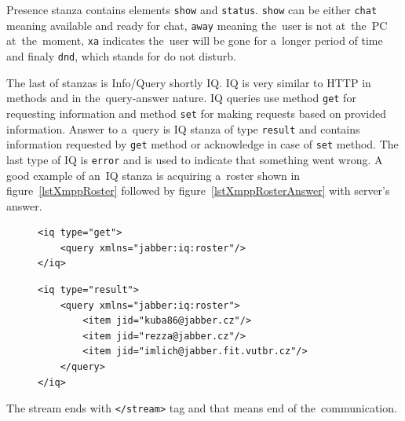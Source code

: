 Presence stanza contains elements \verb|show| and \verb|status|. \verb|show| can be either \verb|chat| meaning available and ready for chat, \verb|away| meaning the~user is not at~the~PC at~the~moment, \verb|xa| indicates the~user will be gone for a~longer period of time and finaly \verb|dnd|, which stands for do not disturb.  

The last of stanzas is Info/Query shortly IQ. IQ is very similar to HTTP in methods and in the~query-answer nature. IQ queries use method \verb|get| for requesting information and method \verb|set| for making requests based on provided information. Answer to a~query is IQ stanza of type \verb|result| and contains information requested by \verb|get| method or acknowledge in case of \verb|set| method. The last type of IQ is \verb|error| and is used to indicate that something went wrong. A good example of an~IQ stanza is acquiring a~roster shown in figure~\ref{lstXmppRoster} followed by figure~\ref{lstXmppRosterAnswer} with server's answer.

\begin{figure}[h]
\begin{lstlisting}
<iq type="get">
	<query xmlns="jabber:iq:roster"/>
</iq>
\end{lstlisting}
\end{figure}

\begin{figure}[h]
\begin{lstlisting}
<iq type="result">
	<query xmlns="jabber:iq:roster">
		<item jid="kuba86@jabber.cz"/>
		<item jid="rezza@jabber.cz"/>
		<item jid="imlich@jabber.fit.vutbr.cz"/>
	</query>
</iq>
\end{lstlisting}
\end{figure}

The stream ends with \verb|</stream>| tag and that means end of the~communication. 

